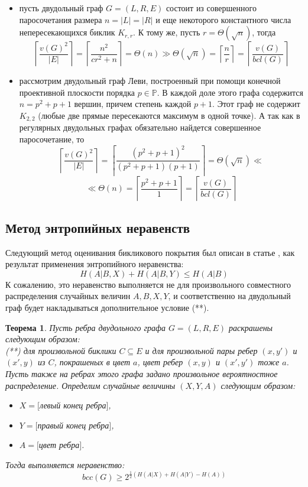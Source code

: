 \documentclass[a4paper]{article}
\newtheorem*{mtheorem}{Теорема}
\begin{document}
\begin{itemize}
    \item пусть двудольный граф $G = (L, R, E)$ состоит из совершенного паросочетания размера 
    $n = |L| = |R|$ и еще некоторого константного числа непересекающихся биклик $K_{r,r}$. 
    К тому же, пусть $r = \Theta(\sqrt{n})$, тогда $$\left\lceil\frac{v(G)^2}{|E|}\right\rceil = 
    \left\lceil\frac{n^2}{cr^2 + n}\right\rceil = \Theta(n) \gg \Theta(\sqrt{n}) = \left\lceil\frac{n}{r}\right\rceil = 
    \left\lceil\frac{v(G)}{bcl(G)}\right\rceil$$ 
    \item рассмотрим двудольный граф Леви, построенный при помощи конечной проективной плоскости порядка 
    $p\in \mathbb{P}$. В каждой доле этого графа содержится $n = p^2 + p + 1$ вершин, причем степень 
    каждой $p+1$. Этот граф не содержит $K_{2,2}$ (любые две прямые пересекаются максимум в одной точке). 
    А так как в регулярных двудольных графах обязательно найдется совершенное паросочетание, то 
    $$\left\lceil\frac{v(G)^2}{|E|}\right\rceil = \left\lceil\frac{(p^2 + p + 1)^2}{(p^2+p+1)(p+1)}\right\rceil = 
    \Theta(\sqrt{n}) \ll$$ $$\ll \Theta(n) = \left\lceil\frac{p^2 + p + 1}{1}\right\rceil = \left\lceil\frac{v(G)}{bcl(G)}\right\rceil$$
\end{itemize}




\subsection{Метод энтропийных неравенств}

Следующий метод оценивания бикликового покрытия был описан в статье \cite{EntropyInequality}, как результат 
применения энтропийного неравенства: $$H(A|B,X) + H(A|B,Y) \leq H(A|B)$$ К сожалению, это неравенство 
выполняется не для произвольного совместного распределения случайных величин $A, B, X, Y$, и соответственно 
на двудольный граф будет накладываться дополнительное условие (**).

\begin{mtheorem}
    Пусть ребра двудольного графа $G = (L, R, E)$ раскрашены следующим образом:\ \\
    (**) для произвольной биклики $C\subseteq E$ и для произвольной пары ребер $(x, y')$ и $(x', y)$ 
    из $C$, покрашеных в цвет $a$, цвет ребер $(x, y)$ и $(x', y')$ тоже $a$.\ \\
    Пусть также на ребрах этого графа задано произвольное вероятностное распределение. Определим случайные 
    величины $(X, Y, A)$ следующим образом:
    \begin{itemize}[noitemsep]
        \item $X = [$левый конец ребра$]$, 
        \item $Y = [$правый конец ребра$]$,
        \item $A = [$цвет ребра$]$.
    \end{itemize}
    Тогда выполняется неравенство: $$bcc(G) \geq 2^{\frac{1}{2}(H(A|X) + H(A|Y) - H(A))}$$
\end{mtheorem}
\end{document}
